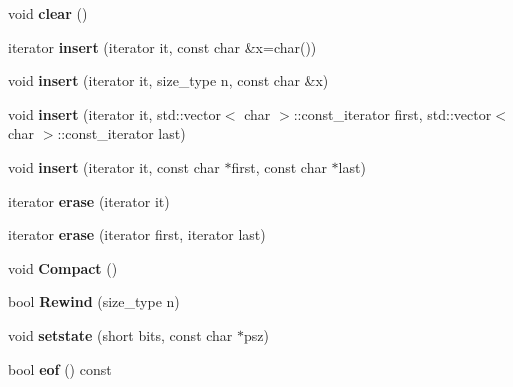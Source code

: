 \begin{DoxyCompactItemize}
void {\bfseries clear} ()
\item 
\mbox{\label{class_c_data_stream_a191a18802fbc0861ae118d79d33088dc}} 
iterator {\bfseries insert} (iterator it, const char \&x=char())
\item 
\mbox{\label{class_c_data_stream_ac8fa6a4a4cd08da5a0c87180834611e5}} 
void {\bfseries insert} (iterator it, size\+\_\+type n, const char \&x)
\item 
\mbox{\label{class_c_data_stream_aa15a60d7ee6d987de444426f2825f284}} 
void {\bfseries insert} (iterator it, std\+::vector$<$ char $>$\+::const\+\_\+iterator first, std\+::vector$<$ char $>$\+::const\+\_\+iterator last)
\item 
\mbox{\label{class_c_data_stream_a9635fda38bc0b7836b4364820a67a18d}} 
void {\bfseries insert} (iterator it, const char $\ast$first, const char $\ast$last)
\item 
\mbox{\label{class_c_data_stream_acb2a195db823f11161ea07c4855e0333}} 
iterator {\bfseries erase} (iterator it)
\item 
\mbox{\label{class_c_data_stream_a7446b23bcfa37cbfa79ccc66f8aff48a}} 
iterator {\bfseries erase} (iterator first, iterator last)
\item 
\mbox{\label{class_c_data_stream_a84c3fd4cf194f3402dc8adce6ab3ccf9}} 
void {\bfseries Compact} ()
\item 
\mbox{\label{class_c_data_stream_a7054311b2fe016b21fb853a1e27812d9}} 
bool {\bfseries Rewind} (size\+\_\+type n)
\item 
\mbox{\label{class_c_data_stream_a6de6e858ed25edc9d0034669cbe62664}} 
void {\bfseries setstate} (short bits, const char $\ast$psz)
\item 
\mbox{\label{class_c_data_stream_ac6b34149b7eea928c925100dfe10c087}} 
bool {\bfseries eof} () const
\item 
\mbox{\label{class_c_data_stream_a209eeee3c1d70d00f4b20e2e8b5bc2da}} 

\end{DoxyCompactItemize}

